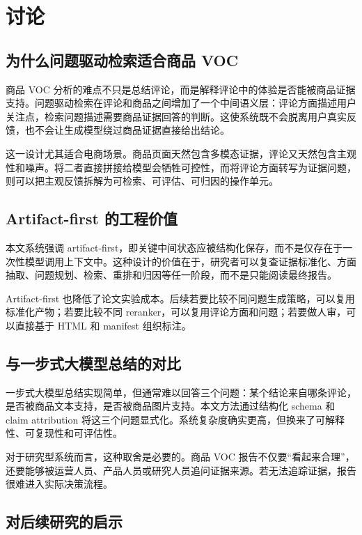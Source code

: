 \documentclass[11pt]{article}
\begin{document}
\section{讨论}
\subsection{为什么问题驱动检索适合商品 VOC}

商品 VOC 分析的难点不只是总结评论，而是解释评论中的体验是否能被商品证据支持。问题驱动检索在评论和商品之间增加了一个中间语义层：评论方面描述用户关注点，检索问题描述需要商品证据回答的判断。这使系统既不会脱离用户真实反馈，也不会让生成模型绕过商品证据直接给出结论。

这一设计尤其适合电商场景。商品页面天然包含多模态证据，评论又天然包含主观性和噪声。将二者直接拼接给模型会牺牲可控性，而将评论方面转写为证据问题，则可以把主观反馈拆解为可检索、可评估、可归因的操作单元。

\subsection{Artifact-first 的工程价值}

本文系统强调 artifact-first，即关键中间状态应被结构化保存，而不是仅存在于一次性模型调用上下文中。这种设计的价值在于，研究者可以复查证据标准化、方面抽取、问题规划、检索、重排和归因等任一阶段，而不是只能阅读最终报告。

Artifact-first 也降低了论文实验成本。后续若要比较不同问题生成策略，可以复用标准化产物；若要比较不同 reranker，可以复用评论方面和问题；若要做人审，可以直接基于 HTML 和 manifest 组织标注。

\subsection{与一步式大模型总结的对比}

一步式大模型总结实现简单，但通常难以回答三个问题：某个结论来自哪条评论，是否被商品文本支持，是否被商品图片支持。本文方法通过结构化 schema 和 claim attribution 将这三个问题显式化。系统复杂度确实更高，但换来了可解释性、可复现性和可评估性。

对于研究型系统而言，这种取舍是必要的。商品 VOC 报告不仅要``看起来合理''，还要能够被运营人员、产品人员或研究人员追问证据来源。若无法追踪证据，报告很难进入实际决策流程。

\subsection{对后续研究的启示}
\end{document}
